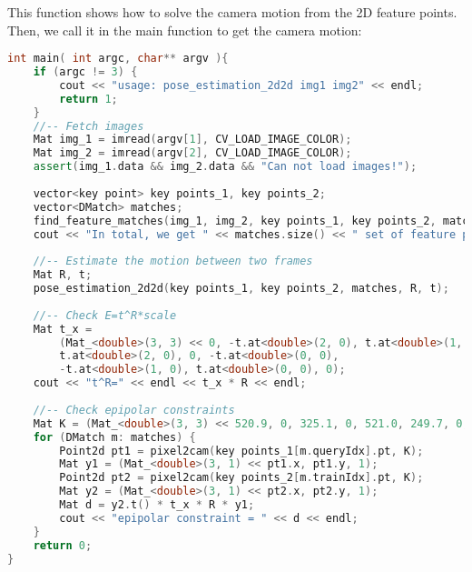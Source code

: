 This function shows how to solve the camera motion from the 2D feature points. Then, we call it in the main function to get the camera motion:
\begin{lstlisting}[language=c++,caption=slambook2/ch7/pose_estimation_2d2d.cpp (part)]
int main( int argc, char** argv ){
    if (argc != 3) {
        cout << "usage: pose_estimation_2d2d img1 img2" << endl;
        return 1;
    }
    //-- Fetch images
    Mat img_1 = imread(argv[1], CV_LOAD_IMAGE_COLOR);
    Mat img_2 = imread(argv[2], CV_LOAD_IMAGE_COLOR);
    assert(img_1.data && img_2.data && "Can not load images!");
    
    vector<key point> key points_1, key points_2;
    vector<DMatch> matches;
    find_feature_matches(img_1, img_2, key points_1, key points_2, matches);
    cout << "In total, we get " << matches.size() << " set of feature points" << endl;
    
    //-- Estimate the motion between two frames
    Mat R, t;
    pose_estimation_2d2d(key points_1, key points_2, matches, R, t);
    
    //-- Check E=t^R*scale
    Mat t_x =
        (Mat_<double>(3, 3) << 0, -t.at<double>(2, 0), t.at<double>(1, 0),
        t.at<double>(2, 0), 0, -t.at<double>(0, 0),
        -t.at<double>(1, 0), t.at<double>(0, 0), 0);
    cout << "t^R=" << endl << t_x * R << endl;
    
    //-- Check epipolar constraints
    Mat K = (Mat_<double>(3, 3) << 520.9, 0, 325.1, 0, 521.0, 249.7, 0, 0, 1);
    for (DMatch m: matches) {
        Point2d pt1 = pixel2cam(key points_1[m.queryIdx].pt, K);
        Mat y1 = (Mat_<double>(3, 1) << pt1.x, pt1.y, 1);
        Point2d pt2 = pixel2cam(key points_2[m.trainIdx].pt, K);
        Mat y2 = (Mat_<double>(3, 1) << pt2.x, pt2.y, 1);
        Mat d = y2.t() * t_x * R * y1;
        cout << "epipolar constraint = " << d << endl;
    }
    return 0;
}
\end{lstlisting}

